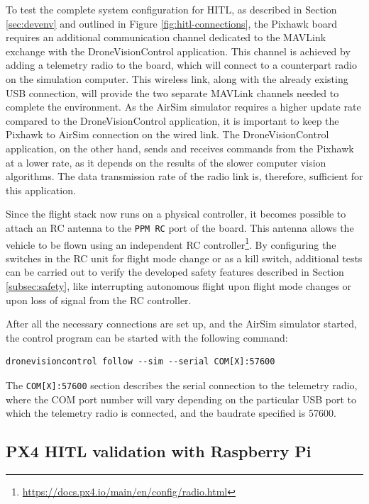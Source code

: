 To test the complete system configuration for HITL, as described in Section \ref{sec:devenv} and outlined in Figure \ref{fig:hitl-connections}, the Pixhawk board requires an additional communication channel dedicated to the MAVLink exchange with the DroneVisionControl application. This channel is achieved by adding a telemetry radio to the board, which will connect to a counterpart radio on the simulation computer. This wireless link, along with the already existing USB connection, will provide the two separate MAVLink channels needed to complete the environment.
As the AirSim simulator requires a higher update rate compared to the DroneVisionControl application, it is important to keep the Pixhawk to AirSim connection on the wired link. The DroneVisionControl application, on the other hand, sends and receives commands from the Pixhawk at a lower rate, as it depends on the results of the slower computer vision algorithms. The data transmission rate of the radio link is, therefore, sufficient for this application.

Since the flight stack now runs on a physical controller, it becomes possible to attach an RC antenna to the \texttt{PPM RC} port of the board. This antenna allows the vehicle to be flown using an independent RC controller\footnote{\url{https://docs.px4.io/main/en/config/radio.html}}. By configuring the switches in the RC unit for flight mode change or as a kill switch, additional tests can be carried out to verify the developed safety features described in Section \ref{subsec:safety}, like interrupting autonomous flight upon flight mode changes or upon loss of signal from the RC controller.


After all the necessary connections are set up, and the AirSim simulator started, the control program can be started with the following command:
\begin{verbatim}
dronevisioncontrol follow --sim --serial COM[X]:57600
\end{verbatim}
The \texttt{COM[X]:57600} section describes the serial connection to the telemetry radio, where the COM port number will vary depending on the particular USB port to which the telemetry radio is connected, and the baudrate specified is 57600.



\subsection{PX4 HITL validation with Raspberry Pi}
\label{sec:test-5-rpi}

